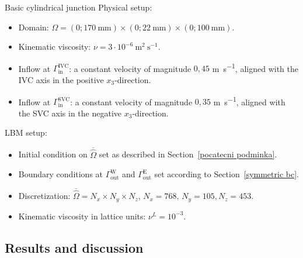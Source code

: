 \begin{optimproblem}{Basic cylindrical junction}
	\vspace{2mm}
	Physical setup:
	\begin{itemize}
		\item Domain: $ \Omega=(0 ; 170 \mathrm{~mm}) \times(0 ; 22 \mathrm{~mm}) \times(0 ; 100 \mathrm{~mm})$.
		\item Kinematic viscosity: $ \nu=3 \cdot 10^{-6} \mathrm{~m}^{2} \mathrm{~s}^{-1}$.
		\item Inflow at $\Gamma^{\text{IVC}}_{\text{in}}$: a constant velocity of magnitude $0{,}45$ \si{m s^{-1}},  aligned with the IVC axis in the positive $x_3$-direction.
		\item Inflow at $\Gamma^{\text{SVC}}_{\text{in}}$: a constant velocity of magnitude $0{,}35$ \si{m s^{-1}}, aligned with the SVC axis in the negative $x_3$-direction.
	\end{itemize} 
	LBM setup:
	\begin{itemize}
		\item Initial condition on $ \overline{\hat{\Omega}} $ set as described in Section~\ref{pocatecni podminka}.
		\item Boundary conditions at $\Gamma^{\text{W}}_{\text{out}}$ and $\Gamma^{\text{E}}_{\text{out}}$ set according to Section~\ref{symmetric bc}.
		\item Discretization: $\overline{\hat{\Omega}} = N_{x} \times N_{y} \times N_{z}$, $N_{x} = 768, \, N_{y} = 105, N_{z} = 453$.
		\item Kinematic viscosity in lattice units: $\nu^{L} = 10^{-3} $.
	\end{itemize}
	\label{optimprob:1}
\end{optimproblem}
\subsection{Results and discussion}



